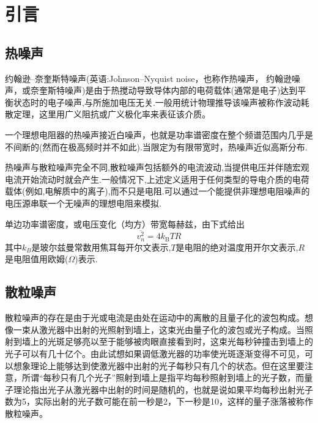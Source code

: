 \documentclass[a4paper]{article}
\begin{document}
\newpage
\begin{center}
\tableofcontents\label{c}
\end{center}
\newpage

\section{引言} \label{overview}%
\subsection{热噪声}
约翰逊–奈奎斯特噪声(英语:Johnson–Nyquist noise，也称作热噪声， 约翰逊噪声，或奈奎斯特噪声)是由于热搅动导致导体内部的电荷载体(通常是电子)达到平衡状态时的电子噪声,与所施加电压无关.一般用统计物理推导该噪声被称作波动耗散定理，这里用广义阻抗或广义极化率来表征该介质。

一个理想电阻器的热噪声接近白噪声，也就是功率谱密度在整个频谱范围内几乎是不间断的(然而在极高频时并不如此).当限定为有限带宽时，热噪声近似高斯分布.

热噪声与散粒噪声完全不同,散粒噪声包括额外的电流波动,当提供电压并伴随宏观电流开始流动时就会产生.一般情况下,上述定义适用于任何类型的导电介质的电荷载体(例如,电解质中的离子),而不只是电阻.可以通过一个能提供非理想电阻噪声的电压源串联一个无噪声的理想电阻来模拟.

单边功率谱密度，或电压变化（均方）带宽每赫兹，由下式给出
\begin{equation}
    \overline {v_{n}^2} = 4 k_\text{B} T R
\end{equation}
其中$k_B$是玻尔兹曼常数用焦耳每开尔文表示,$T$是电阻的绝对温度用开尔文表示,$R$是电阻值用欧姆($\Omega$)表示.
\subsection{散粒噪声}
散粒噪声的存在是由于光或电流是由处在运动中的离散的且量子化的波包构成。想像一束从激光器中出射的光照射到墙上，这束光由量子化的波包或光子构成。当照射到墙上的光斑足够亮以至于能够被肉眼直接看到时，这束光每秒钟撞击到墙上的光子可以有几十亿个。由此试想如果调低激光器的功率使光斑逐渐变得不可见，可以想象理论上能够达到使激光器中出射的光子每秒只有几个的状态。但在这里要注意，所谓“每秒只有几个光子”照射到墙上是指平均每秒照射到墙上的光子数，而量子理论指出光子从激光器中出射的时间是随机的，也就是说如果平均每秒出射光子数为5，实际出射的光子数可能在前一秒是2，下一秒是10，这样的量子涨落被称作散粒噪声。
\end{document}
